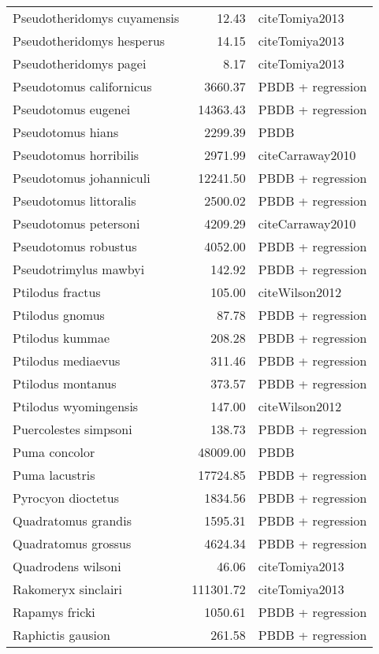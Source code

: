 \begin{table}[ht]
\begin{tabular}{lrl}
  Pseudotheridomys cuyamensis & 12.43 & cite{Tomiya2013} \\ 
  Pseudotheridomys hesperus & 14.15 & cite{Tomiya2013} \\ 
  Pseudotheridomys pagei & 8.17 & cite{Tomiya2013} \\ 
  Pseudotomus californicus & 3660.37 & PBDB + regression \\ 
  Pseudotomus eugenei & 14363.43 & PBDB + regression \\ 
  Pseudotomus hians & 2299.39 & PBDB \\ 
  Pseudotomus horribilis & 2971.99 & cite{Carraway2010} \\ 
  Pseudotomus johanniculi & 12241.50 & PBDB + regression \\ 
  Pseudotomus littoralis & 2500.02 & PBDB + regression \\ 
  Pseudotomus petersoni & 4209.29 & cite{Carraway2010} \\ 
  Pseudotomus robustus & 4052.00 & PBDB + regression \\ 
  Pseudotrimylus mawbyi & 142.92 & PBDB + regression \\ 
  Ptilodus fractus & 105.00 & cite{Wilson2012} \\ 
  Ptilodus gnomus & 87.78 & PBDB + regression \\ 
  Ptilodus kummae & 208.28 & PBDB + regression \\ 
  Ptilodus mediaevus & 311.46 & PBDB + regression \\ 
  Ptilodus montanus & 373.57 & PBDB + regression \\ 
  Ptilodus wyomingensis & 147.00 & cite{Wilson2012} \\ 
  Puercolestes simpsoni & 138.73 & PBDB + regression \\ 
  Puma concolor & 48009.00 & PBDB \\ 
  Puma lacustris & 17724.85 & PBDB + regression \\ 
  Pyrocyon dioctetus & 1834.56 & PBDB + regression \\ 
  Quadratomus grandis & 1595.31 & PBDB + regression \\ 
  Quadratomus grossus & 4624.34 & PBDB + regression \\ 
  Quadrodens wilsoni & 46.06 & cite{Tomiya2013} \\ 
  Rakomeryx sinclairi & 111301.72 & cite{Tomiya2013} \\ 
  Rapamys fricki & 1050.61 & PBDB + regression \\ 
  Raphictis gausion & 261.58 & PBDB + regression \\ 

\end{tabular}
\end{table}
